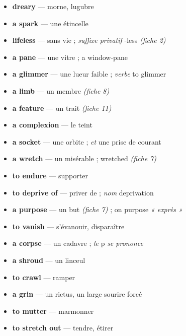 \documentclass{fiche}
\begin{document}

\begin{itemize}[label=--,itemsep=0.8mm,leftmargin=*]\small
  \item \textbf{dreary} — morne, lugubre
  \item \textbf{a spark} — une étincelle
  \item \textbf{lifeless} — sans vie ; \textit{suffixe privatif} -less \textit{(fiche 2)}
  \item \textbf{a pane} — une vitre ; a window-pane
  \item \textbf{a glimmer} — une lueur faible ; \textit{verbe} to glimmer
  \item \textbf{a limb} — un membre \textit{(fiche 8)}
  \item \textbf{a feature} — un trait \textit{(fiche 11)}
  \item \textbf{a complexion} — le teint
  \item \textbf{a socket} — une orbite ; \textit{et} une prise de courant
  \item \textbf{a wretch} — un misérable ; wretched \textit{(fiche 7)}
  \item \textbf{to endure} — supporter
  \item \textbf{to deprive of} — priver de ; \textit{nom} deprivation
  \item \textbf{a purpose} — un but \textit{(fiche 7)} ; on purpose \textit{« exprès »}
  \item \textbf{to vanish} — s'évanouir, disparaître
  \item \textbf{a corpse} — un cadavre ; \textit{le} p \textit{se prononce}
  \item \textbf{a shroud} — un linceul
  \item \textbf{to crawl} — ramper
  \item \textbf{a grin} — un rictus, un large sourire forcé
  \item \textbf{to mutter} — marmonner
  \item \textbf{to stretch out} — tendre, étirer
\end{itemize}
\end{document}
